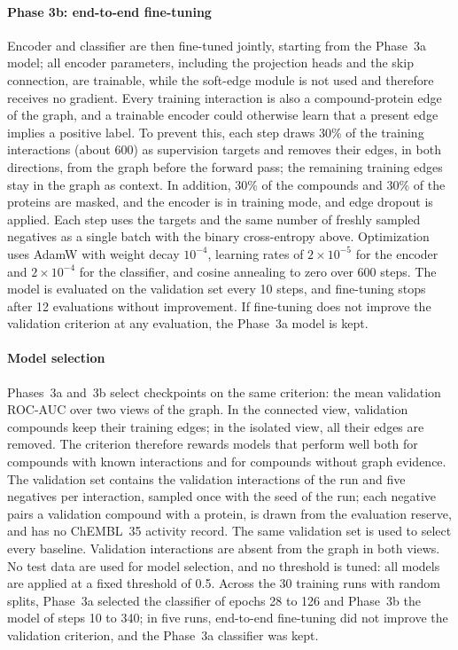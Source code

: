 \documentclass[11pt,letterpaper]{article}
\begin{document}
\paragraph{Phase 3b: end-to-end fine-tuning}
Encoder and classifier are then fine-tuned jointly, starting from the Phase~3a model; all encoder parameters, including the projection heads and the skip connection, are trainable, while the soft-edge module is not used and therefore receives no gradient. Every training interaction is also a compound-protein edge of the graph, and a trainable encoder could otherwise learn that a present edge implies a positive label. To prevent this, each step draws 30\% of the training interactions (about 600) as supervision targets and removes their edges, in both directions, from the graph before the forward pass; the remaining training edges stay in the graph as context. In addition, 30\% of the compounds and 30\% of the proteins are masked, and the encoder is in training mode, and edge dropout is applied. Each step uses the targets and the same number of freshly sampled negatives as a single batch with the binary cross-entropy above. Optimization uses AdamW with weight decay $10^{-4}$, learning rates of $2\times 10^{-5}$ for the encoder and $2\times 10^{-4}$ for the classifier, and cosine annealing to zero over 600 steps. The model is evaluated on the validation set every 10 steps, and fine-tuning stops after 12 evaluations without improvement. If fine-tuning does not improve the validation criterion at any evaluation, the Phase~3a model is kept.

\paragraph{Model selection}
Phases~3a and~3b select checkpoints on the same criterion: the mean validation ROC-AUC over two views of the graph. In the connected view, validation compounds keep their training edges; in the isolated view, all their edges are removed. The criterion therefore rewards models that perform well both for compounds with known interactions and for compounds without graph evidence. The validation set contains the validation interactions of the run and five negatives per interaction, sampled once with the seed of the run; each negative pairs a validation compound with a protein, is drawn from the evaluation reserve, and has no ChEMBL~35 activity record. The same validation set is used to select every baseline. Validation interactions are absent from the graph in both views. No test data are used for model selection, and no threshold is tuned: all models are applied at a fixed threshold of 0.5. Across the 30 training runs with random splits, Phase~3a selected the classifier of epochs 28 to 126 and Phase~3b the model of steps 10 to 340; in five runs, end-to-end fine-tuning did not improve the validation criterion, and the Phase~3a classifier was kept.
\end{document}
